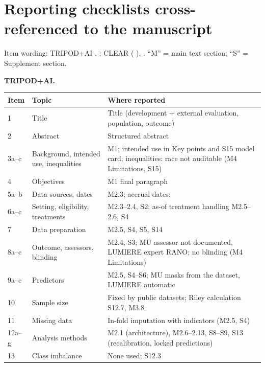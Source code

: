 \documentclass[11pt,a4paper]{article}
\begin{document}
\FloatBarrier
\section[Reporting checklists (TRIPOD+AI, CLEAR) cross-referenced to the manuscript]{Reporting checklists
cross-referenced to the manuscript}\label{sec:S17}

Item wording: TRIPOD+AI \citep{collins2024},
; CLEAR
(\citealp{kocak2023} \flag{[CHECK]}),
. ``M'' = main text section;
``S'' = Supplement section.

\clearpage
\textbf{TRIPOD+AI.}

\begin{table}[H]
\centering
\footnotesize
\begin{tabularx}{\linewidth}{@{}R{1.1cm} R{5.4cm} L@{}}
\toprule
Item & Topic & Where reported \\
 & Title & Title (development + external evaluation, population, outcome) \\
2 & Abstract & Structured abstract \\
3a--c & Background, intended use, inequalities & M1; intended use in Key points and S15 model card; inequalities: race not auditable (M4 Limitations, S15) \\
4 & Objectives & M1 final paragraph \\
5a--b & Data sources, dates & M2.3; accrual dates:  \\
6a--c & Setting, eligibility, treatments & M2.3--2.4, S2; as-of treatment handling M2.5--2.6, S4 \\
7 & Data preparation & M2.5, S4, S5, S14 \\
8a--c & Outcome, assessors, blinding & M2.4, S3; MU assessor not documented, LUMIERE expert RANO; no blinding (M4 Limitations) \\
9a--c & Predictors & M2.5, S4--S6; MU masks from the dataset, LUMIERE automatic \\
10 & Sample size & Fixed by public datasets; Riley calculation S12.7, M3.8 \\
11 & Missing data & In-fold imputation with indicators (M2.5, S4) \\
12a--g & Analysis methods & M2.1 (architecture), M2.6--2.13, S8--S9, S13 (recalibration, locked predictions) \\
13 & Class imbalance & None used; S12.3 \\

\end{tabularx}
\end{table}
\end{document}
